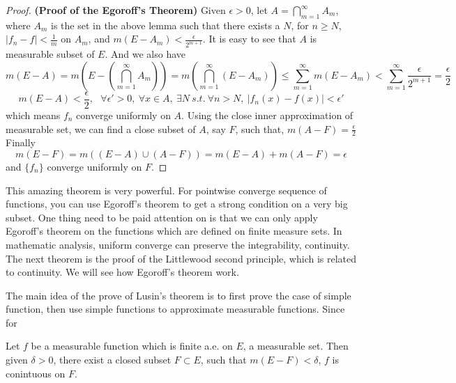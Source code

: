 \documentclass[lang=en, 12pt]{elegantbook}
\begin{document}
                \begin{proof}\textbf{(Proof of the Egoroff's Theorem)}
                Given $\epsilon > 0$, let $A = \bigcap_{m=1}^{\infty} A_m$, where $A_m$ is the set in the above lemma 
            such that there exists a $N$, for $n\geq N$, $|f_n -f|< \frac{1}{m}$ on $A_m$, and $m(E - A_m)< \frac{\epsilon}{2^{m+1}}$.
            It is easy to see that $A$ is measurable subset of $E$. And we also have 
            $$m(E-A) = m(E-(\bigcap_{m=1}^{\infty}A_m)) = m(\bigcap_{m=1}^{\infty} (E-A_m)) \leq \sum_{m=1}^{\infty} m(E - A_m)< 
            \sum_{m=1}^{\infty} \frac{\epsilon}{2^{m+1}} = \frac{\epsilon}{2}$$    
            $$m(E-A)< \frac{\epsilon}{2}, \ \ \ \forall \epsilon' >0, \ \forall x \in A, \ \exists N \ s.t. \
            \forall n >N , \ |f_n(x) - f(x)|< \epsilon' $$
            which means $f_n$ converge uniformly on $A$. Using the close inner approximation of measurable set, we can find a close 
        subset of $A$, say $F$, such that, $m(A-F) = \frac{\epsilon}{2}$
            Finally
            $$m(E-F) = m((E-A) \cup (A - F)) = m(E - A) +m(A - F) = \epsilon$$
            and $\{f_n\}$ converge uniformly on $F$.
            \end{proof}
            This amazing theorem is very powerful. For pointwise converge sequence of functions, you can use Egoroff's theorem to get a 
        strong condition on a very big subset. One thing need to be paid attention on is that we can only apply Egoroff's theorem 
        on the functions which are defined on finite measure sets. In mathematic analysis, uniform converge can preserve the integrability, continuity.
        The next theorem is the proof of the Littlewood second principle, which is related to continuity. We will see how Egoroff's theorem 
        work. \par
            The main idea of the prove of Lusin's theorem is to first prove the case of simple function, then use simple functions to 
        approximate measurable functions. Since for 
            \begin{theorem}
                Let $f$ be a measurable function which is finite a.e. on $E$, a measurable set. Then given $\delta > 0$, 
            there exist a closed subset $F \subset E$, such that $m(E-F)< \delta$, $f$ is conintuous on $F$.
            \end{theorem}
\end{document}
